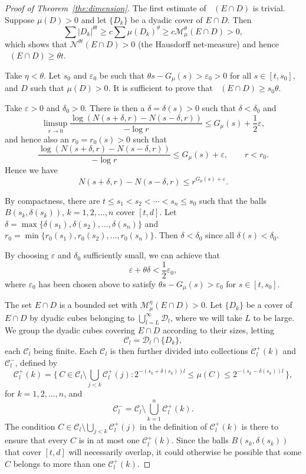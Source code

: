 \documentclass[10pt]{amsart}
\theoremstyle{definition}\newtheorem{defi}[theo]{Definition}\newtheorem{rema}[theo]{Remark}\newtheorem{exam}[theo]{Example}\newtheorem{exem}[theo]{Example}\newtheorem{nota}[theo]{Notation}
\DeclareMathOperator{\dimh}{dim_H}
\begin{document}
\begin{proof}[Proof of Theorem~\ref{the:dimension}]
The first estimate of $\dimh (E \cap D)$ is trivial. Suppose $\mu (D) > 0$ and let $\{D_k\}$ be a dyadic cover of $E \cap D$. Then
\[
\sum |D_k|^{\theta t} \geq c \sum \mu (D_k)^\theta \geq c
\mathscr{M}_{\mu}^\theta (E \cap D) > 0,
\]
which shows that $\mathscr{N}^{\theta t} (E \cap D) > 0$ (the Hausdorff net-measure) and hence \linebreak$\dimh (E \cap D) \geq \theta t$.

Take $\eta < \theta$. Let $s_0$ and $\varepsilon_0$ be such that $\theta s - G_\mu (s) > \varepsilon_0 > 0$ for all $s \in [t,s_0]$, and $D$ such that $\mu (D) > 0$. It is sufficient to prove that $\dimh (E \cap D) \geq s_0 \theta$.

Take $\varepsilon > 0$ and $\delta_0 > 0$. There is then a $\delta =
\delta (s) > 0$ such that $\delta < \delta_0$ and
\[
\limsup_{r \to 0} \frac{\log (N(s+\delta, r) - N(s-\delta, r))}{-
\log r} \leq G_\mu (s) + \frac{1}{2} \varepsilon,
\]
and hence also an $r_0 = r_0 (s) > 0$ such that
\[
\frac{\log (N(s+\delta, r) - N(s-\delta, r))}{-
\log r} \leq G_\mu (s) + \varepsilon, \qquad r < r_0.
\]
Hence we have
\begin{equation}\label{eq:numberofcubes}
N(s+\delta, r) - N(s-\delta, r) \leq r^{G_\mu (s) + \varepsilon}.
\end{equation}

By compactness, there are $t \leq s_1 < s_2 < \cdots < s_n \leq s_0$ such that the balls $B(s_k, \delta(s_k))$, $k = 1, 2, \ldots, n$ cover $[t,d]$. Let $\delta = \max \{\delta (s_1), \delta(s_2),
\ldots, \delta(s_n)\}$ and $r_0 = \min \{r_0 (s_1), r_0(s_2),
\ldots, r_0(s_n)\}$. Then $\delta < \delta_0$ since all $\delta (s) < \delta_0$.

By choosing $\varepsilon$ and $\delta_0$ sufficiently small, we can achieve that
\[
\varepsilon + \theta \delta < \frac{1}{2} \varepsilon_0,
\]
where $\varepsilon_0$ has been chosen above to satisfy $\theta s - G_\mu (s) > \varepsilon_0$ for $s \in [t,s_0]$.

The set $E \cap D$ is a bounded set with $\mathscr{M}_\mu^\eta (E
\cap D) > 0$. Let $\{D_k\}$ be a cover of $E \cap D$ by dyadic cubes belonging to $\bigcup_{l = L}^\infty \mathscr{D}_l$, where we will take $L$ to be large. We group the dyadic cubes covering $E \cap D$ according to their sizes, letting
\[
\mathscr{C}_l = \mathscr{D}_l \cap \{D_k\},
\]
each $\mathscr{C}_l$ being finite. Each $\mathscr{C}_l$ is then further divided into collections $\mathscr{C}_l^+ (k)$ and $\mathscr{C}_l^-$, defined by
\[
\mathscr{C}_l^+ (k) = \biggl\{\, C \in \mathscr{C}_l \setminus
\bigcup_{j < k} \mathscr{C}_l^+ (j) : 2^{-(s_k+\delta (s_k))l} \leq
\mu (C) \leq 2^{-(s_k-\delta (s_k))l} \,\biggr\},
\]
for $k = 1,2,\ldots,n$, and
\[
\mathscr{C}_l^- = \mathscr{C}_l \setminus \bigcup_{k=1}^n
\mathscr{C}_l^+ (k).
\]
The condition $C \in \mathscr{C}_l \setminus \bigcup_{j < k}
\mathscr{C}_l^+ (j)$ in the definition of $\mathscr{C}_l^+ (k)$ is there to ensure that every $C$ is in at most one $\mathscr{C}_l^+ (k)$. Since the balls $B (s_k, \delta(s_k))$ that cover $[t,d]$ will necessarily overlap, it could otherwise be possible that some $C$ belongs to more than one $\mathscr{C}_l^+ (k)$.


\end{proof}
\end{document}
